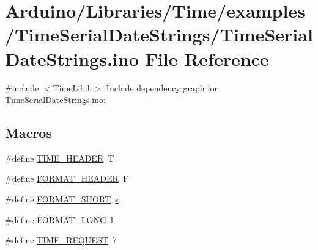\hypertarget{_time_serial_date_strings_8ino}{}\section{Arduino/\+Libraries/\+Time/examples/\+Time\+Serial\+Date\+Strings/\+Time\+Serial\+Date\+Strings.ino File Reference}
\label{_time_serial_date_strings_8ino}
{\ttfamily \#include $<$Time\+Lib.\+h$>$}\newline
Include dependency graph for Time\+Serial\+Date\+Strings.\+ino\+:
\subsection*{Macros}
\begin{DoxyCompactItemize}
\item 
\#define \hyperlink{_time_serial_date_strings_8ino_aa9f2cbf2a35ec653aff12241a63ca864}{T\+I\+M\+E\+\_\+\+H\+E\+A\+D\+ER}~\textquotesingle{}T\textquotesingle{}
\item 
\#define \hyperlink{_time_serial_date_strings_8ino_a0d13e168e30875fc39d1da1966c5ddc8}{F\+O\+R\+M\+A\+T\+\_\+\+H\+E\+A\+D\+ER}~\textquotesingle{}F\textquotesingle{}
\item 
\#define \hyperlink{_time_serial_date_strings_8ino_aa1dc30eb9958bd483c7de9ea575acf49}{F\+O\+R\+M\+A\+T\+\_\+\+S\+H\+O\+RT}~\textquotesingle{}\hyperlink{_w_s_8ino_a5109c1e8d8d5228b4290813adb0be47b}{s}\textquotesingle{}
\item 
\#define \hyperlink{_time_serial_date_strings_8ino_acf04ec5bf2d3f42a055c143fd7d3e031}{F\+O\+R\+M\+A\+T\+\_\+\+L\+O\+NG}~\textquotesingle{}\hyperlink{_w_s_8ino_a3d755e761d498d63ec8ff4ba107f9b37}{l}\textquotesingle{}
\item 
\#define \hyperlink{_time_serial_date_strings_8ino_a355248075031107c0438456dd7357b63}{T\+I\+M\+E\+\_\+\+R\+E\+Q\+U\+E\+ST}~7
\end{DoxyCompactItemize}
